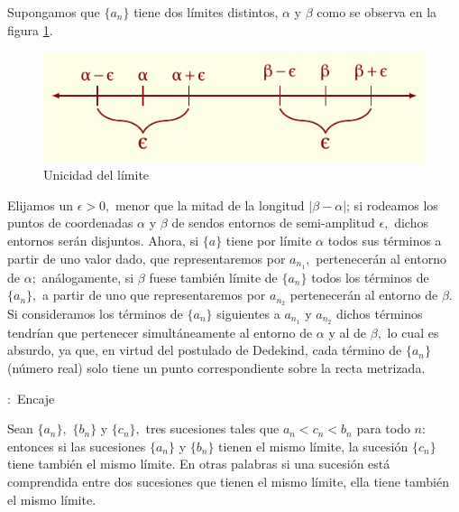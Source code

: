 \documentclass[oneside,english,spanish,2m,twoside,svgnames,x11names,HTML,twoside,12pt]{libro-matua}\usepackage[]{graphicx}\usepackage[]{color}
\newcommand{\val}[1]{\left|#1\right|}
\begin{document}
\begin{dems}

Supongamos que $\{a_{n}\}$ tiene dos límites distintos, $\alpha$
y $\beta$ como se observa en la figura \ref{fig:cal_lim10}. 

\begin{figure}[H] \centering

\includegraphics{11_home_antalcides_MEGA_calculo_I_libro_pdf_cal_lim10.pdf}
\caption{Unicidad del límite}
\label{fig:cal_lim10} \end{figure}

Elijamos un $\epsilon>0,$ menor que la mitad de la longitud $\val{\beta-\alpha}$;
si rodeamos los puntos de coordenadas $\alpha$ y $\beta$ de sendos
entornos de semi-amplitud $\epsilon,$ dichos entornos serán disjuntos.
Ahora, si $\{a\}$ tiene por límite $\alpha$ todos sus términos a
partir de uno valor dado, que representaremos por $a_{n_{1}},$ pertenecerán
al entorno de $\alpha;$ análogamente, si $\beta$ fuese también límite
de $\{a_{n}\}$ todos los términos de $\{a_{n}\},$ a partir de uno
que representaremos por $a_{n_{2}}$ pertenecerán al entorno de $\beta.$
Si consideramos los términos de $\{a_{n}\}$ siguientes a $a_{n_{1}}$
y $a_{n_{2}}$ dichos términos tendrían que pertenecer simultáneamente
al entorno de $\alpha$ y al de $\beta,$ lo cual es absurdo, ya que,
en virtud del postulado de Dedekind, cada término de $\{a_{n}\}$
(número real) solo tiene un punto correspondiente sobre la recta metrizada.\end{dems}

\begin{propiedad}{:\ Encaje}

Sean $\{a_{n}\},$ $\{b_{n}\}$ y $\{c_{n}\},$ tres sucesiones tales
que $a_{n}<c_{n}<b_{n}$ para todo $n:$ entonces si las sucesiones
$\{a_{n}\}$ y $\{b_{n}\}$ tienen el mismo límite, la sucesión $\{c_{n}\}$
tiene también el mismo límite. En otras palabras si una sucesión está
comprendida entre dos sucesiones que tienen el mismo límite, ella
tiene también el mismo límite.

\end{propiedad}
\end{document}
